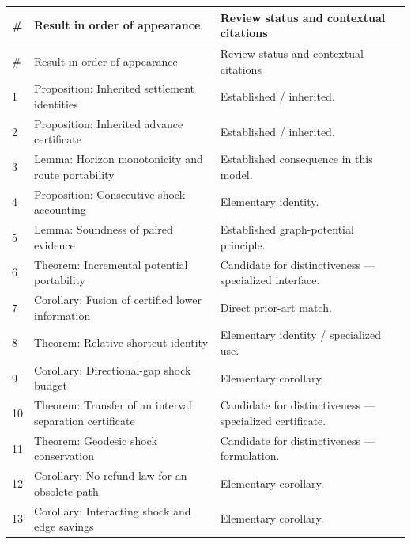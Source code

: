 \documentclass[11pt]{article}
\theoremstyle{definition}\newtheorem{definition}[theorem]{Definition}\newtheorem{assumption}[theorem]{Assumption}
\theoremstyle{remark}\newtheorem{remark}[theorem]{Remark}
\begin{document}
\small
\begin{longtable}{@{}p{.045\linewidth}p{.415\linewidth}p{.44\linewidth}@{}}
\toprule
\# & Result in order of appearance & Review status and contextual citations\\
\midrule
\endfirsthead
\toprule
\# & Result in order of appearance & Review status and contextual citations\\
\midrule
\endhead
1 & Proposition: Inherited settlement identities & Established / inherited. \cite{W0,Bellman1958,Hart1968} \\
2 & Proposition: Inherited advance certificate & Established / inherited. \cite{W0,Hart1968,GoldbergHarrelson2005} \\
3 & Lemma: Horizon monotonicity and route portability & Established consequence in this model. \cite{KoenigLikhachev2002,KoenigLikhachevFurcy2004} \\
4 & Proposition: Consecutive-shock accounting & Elementary identity. \cite{Bellman1958,KoenigLikhachevFurcy2004} \\
5 & Lemma: Soundness of paired evidence & Established graph-potential principle. \cite{GoldbergHarrelson2005,Hart1968} \\
6 & Theorem: Incremental potential portability & Candidate for distinctiveness --- specialized interface. \cite{KoenigLikhachev2002,KoenigLikhachevFurcy2004,Necula1997} \\
7 & Corollary: Fusion of certified lower information & Direct prior-art match. \cite[Lemma~2.2]{GoldbergHarrelson2005} \\
8 & Theorem: Relative-shortcut identity & Elementary identity / specialized use. \cite{Bellman1958,KoenigLikhachevFurcy2004} \\
9 & Corollary: Directional-gap shock budget & Elementary corollary. \cite{Hart1968,GoldbergHarrelson2005} \\
10 & Theorem: Transfer of an interval separation certificate & Candidate for distinctiveness --- specialized certificate. \cite{Hart1968,GoldbergHarrelson2005,KoenigLikhachevFurcy2004} \\
11 & Theorem: Geodesic shock conservation & Candidate for distinctiveness --- formulation. \cite{Bellman1958,GoldbergHarrelson2005} \\
12 & Corollary: No-refund law for an obsolete path & Elementary corollary. \cite{Bellman1958,GoldbergHarrelson2005} \\
13 & Corollary: Interacting shock and edge savings & Elementary corollary. \cite{Bellman1958,GoldbergHarrelson2005} \\

\end{longtable}
\end{document}
